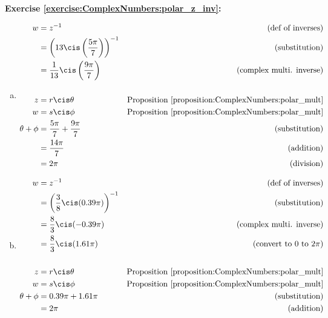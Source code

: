 \noindent\textbf{Exercise \ref{exercise:ComplexNumbers:polar_z_inv}:}
\begin{enumerate}[(a)]
\item
\begin{align*}
w &= z^{-1} &\text{(def of inverses)}\\
&= \left(13 \cis\left(\frac{5\pi}{7}\right)\right)^{-1} &\text{(substitution)}\\
&= \frac{1}{13}\cis\left(\frac{9\pi}{7}\right) &\text{(complex multi. inverse)}\\
\\
z &= r\cis\theta &\text{Proposition~\ref{proposition:ComplexNumbers:polar_mult}}\\
w &= s\cis\phi &\text{Proposition~\ref{proposition:ComplexNumbers:polar_mult}}\\
\theta + \phi &= \frac{5\pi}{7} + \frac{9\pi}{7} &\text{(substitution)}\\
&= \frac{14\pi}{7} &\text{(addition)}\\
&= 2\pi &\text{(division)}
\end{align*}

\item
\begin{align*}
w &= z^{-1} &\text{(def of inverses)}\\
&= \left(\frac{3}{8} \cis(0.39\pi)\right)^{-1} &\text{(substitution)}\\
&= \frac{8}{3} \cis(-0.39\pi) &\text{(complex multi. inverse)}\\
&= \frac{8}{3} \cis(1.61\pi) &\text{(convert to 0 to 2$\pi$)}\\
\\
z &= r\cis\theta &\text{Proposition~\ref{proposition:ComplexNumbers:polar_mult}}\\
w &= s\cis\phi &\text{Proposition~\ref{proposition:ComplexNumbers:polar_mult}}\\
\theta + \phi &= 0.39\pi + 1.61\pi &\text{(substitution)}\\
&= 2\pi &\text{(addition)}
\end{align*}


\end{enumerate}
